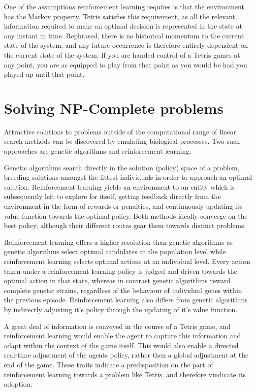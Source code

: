 \documentclass{rucsthesis}
\begin{document}
One of the assumptions reinforcement learning requires is that the environment has the Markov property\citep{suttonbarto}. Tetris satisfies this requirement, as all the relevant information required to make an optimal decision is represented in the state at any instant in time. Rephrased, there is no historical momentum to the current state of the system, and any future occurrence is therefore entirely dependent on the current state of the system. If you are handed control of a Tetris games at any point, you are as equipped to play from that point as you would be had you played up until that point.

\section{Solving NP-Complete problems}

Attractive solutions to problems outside of the computational range of linear search methods can be discovered by emulating biological processes. Two such approaches are genetic algorithms and reinforcement learning. 

Genetic algorithms search directly in the solution (policy) space of a problem, breeding solutions amongst the fittest individuals in order to approach an optimal solution. Reinforcement learning yields an environment to an entity which is subsequently left to explore for itself, getting feedback directly from the environment in the form of rewards or penalties, and continuously updating its value function towards the optimal policy. Both methods ideally converge on the best policy\citep{evvsrl}, although their different routes gear them towards distinct problems.

Reinforcement learning offers a higher resolution than genetic algorithms as genetic algorithms select optimal candidates at the population level while reinforcement learning  selects optimal actions at an individual level\citep{evvsrl}. Every action taken under a reinforcement learning policy is judged and driven towards the optimal action in that state, whereas in contrast genetic algorithms reward complete genetic strains, regardless of the behaviour of individual genes within the previous episode. Reinforcement learning also differs from genetic algorithms by indirectly adjusting it's policy through the updating of it's value function. 

A great deal of information is conveyed in the course of a Tetris game, and reinforcement learning would enable the agent to capture this information and adapt within the context of the game itself. This would also enable a directed real-time adjustment of the agents policy, rather then a global adjustment at the end of the game. These traits indicate a predisposition on the part of reinforcement learning towards a problem like Tetris, and therefore vindicate its adoption.
\end{document}
